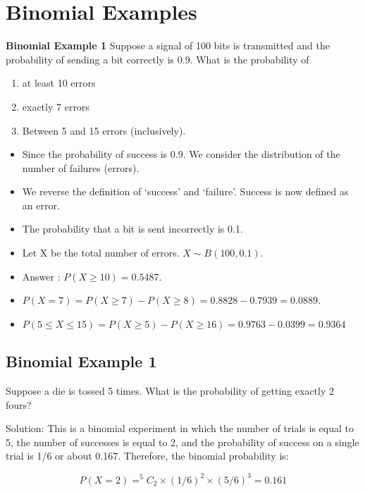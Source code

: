 \documentclass[]{report}
\begin{document}
\section{Binomial Examples}		
		\textbf{Binomial Example 1}
		Suppose a signal of 100 bits is transmitted and the probability of
		sending a bit correctly is 0.9. What is the probability of
		\begin{enumerate}
			\item  at least 10 errors
			\item  exactly 7 errors
			\item  Between 5 and 15 errors (inclusively).
		\end{enumerate}
		


		\begin{itemize}
			\item  Since the probability of success is 0.9. We consider the distribution
			of the number of failures (errors).
			\item  We reverse the definition of `success' and `failure'. Success is now defined as an error.
			\item  The probability that a bit is sent incorrectly is 0.1.
			\item  Let X be the total number of errors. $X \sim B(100, 0.1)$.
			\item  Answer : $P(X \geq 10) = 0.5487$.
			\item  $P(X = 7)=P(X \geq 7) - P(X \geq 8) =0.8828 - 0.7939 = 0.0889$.
			\item  $P(5 \leq X  \leq 15) = P(X \geq 5) - P(X \geq 16) =0.9763 - 0.0399 = 0.9364$
		\end{itemize}
		



\subsection{ Binomial Example 1}
	
	Suppose a die is tossed 5 times. What is the probability of getting exactly 2 fours?
	
	Solution: This is a binomial experiment in which the number of trials is equal to 5, the number of successes is equal to 2, and the probability of success on a single trial is 1/6 or about 0.167. Therefore, the binomial probability is:
	
	\[P(X=2) = ^5C_2 \times (1/6)^2 \times (5/6)^3 = 0.161\]
\end{document}
